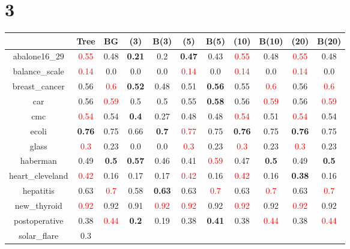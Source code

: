 \documentclass{article}%
\begin{document}
\section*{3}%
\begin{tabular}{c|cccccccccc}%
\hline%
&Tree&BG&(3)&B(3)&(5)&B(5)&(10)&B(10)&(20)&B(20)\\%
\hline%
abalone16\_29&\textcolor{red}{ 
0.55
}&0.48&\textbf{0.21}&0.2&\textbf{0.47}&0.43&\textcolor{red}{ 
0.55
}&0.48&\textcolor{red}{ 
0.55
}&0.48\\%
\hline%
balance\_scale&\textcolor{red}{ 
0.14
}&0.0&0.0&0.0&\textcolor{red}{ 
0.14
}&0.0&\textcolor{red}{ 
0.14
}&0.0&\textcolor{red}{ 
0.14
}&0.0\\%
\hline%
breast\_cancer&0.56&\textcolor{red}{ 
0.6
}&\textbf{0.52}&0.48&0.51&\textbf{0.56}&0.55&\textcolor{red}{ 
0.6
}&0.56&\textcolor{red}{ 
0.6
}\\%
\hline%
car&0.56&\textcolor{red}{ 
0.59
}&0.5&0.5&0.55&\textbf{0.58}&0.56&\textcolor{red}{ 
0.59
}&0.56&\textcolor{red}{ 
0.59
}\\%
\hline%
cmc&\textcolor{red}{ 
0.54
}&0.54&\textbf{0.4}&0.27&0.48&0.48&\textcolor{red}{ 
0.54
}&0.51&\textcolor{red}{ 
0.54
}&0.54\\%
\hline%
ecoli&\textbf{0.76}&0.75&0.66&\textbf{0.7}&\textcolor{red}{ 
0.77
}&0.75&\textbf{0.76}&0.75&\textbf{0.76}&0.75\\%
\hline%
glass&\textcolor{red}{ 
0.3
}&0.23&0.0&0.0&\textcolor{red}{ 
0.3
}&0.23&\textcolor{red}{ 
0.3
}&0.23&\textcolor{red}{ 
0.3
}&0.23\\%
\hline%
haberman&0.49&\textbf{0.5}&\textbf{0.57}&0.46&0.41&\textcolor{red}{ 
0.59
}&0.47&\textbf{0.5}&0.49&\textbf{0.5}\\%
\hline%
heart\_cleveland&\textcolor{red}{ 
0.42
}&0.16&0.17&0.17&\textcolor{red}{ 
0.42
}&0.16&\textcolor{red}{ 
0.42
}&0.16&\textbf{0.38}&0.16\\%
\hline%
hepatitis&0.63&\textcolor{red}{ 
0.7
}&0.58&\textbf{0.63}&0.63&\textcolor{red}{ 
0.7
}&0.63&\textcolor{red}{ 
0.7
}&0.63&\textcolor{red}{ 
0.7
}\\%
\hline%
new\_thyroid&\textcolor{red}{ 
0.92
}&0.92&0.91&\textcolor{red}{ 
0.92
}&\textcolor{red}{ 
0.92
}&0.92&\textcolor{red}{ 
0.92
}&0.92&\textcolor{red}{ 
0.92
}&0.92\\%
\hline%
postoperative&0.38&\textcolor{red}{ 
0.44
}&\textbf{0.2}&0.19&0.38&\textbf{0.41}&0.38&\textcolor{red}{ 
0.44
}&0.38&\textcolor{red}{ 
0.44
}\\%
\hline%
solar\_flare&0.3&\textcolor{red}{ 
}
\end{tabular}
\end{document}
